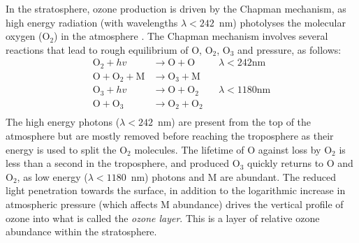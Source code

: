     In the stratosphere, ozone production is driven by the Chapman mechanism, as high energy radiation (with wavelengths $\lambda<242$~nm) photolyses the molecular oxygen (O$_2$) in the atmosphere \parencite[][Chapter 3, section 2]{BrasseurJacob2017}.
    The Chapman mechanism involves several reactions that lead to rough equilibrium of O, O$_2$, O$_3$ and pressure, as follows:
    \begin{equation}
      \begin{aligned}
        \text{O}_2 + hv              & \to \text{O}+\text{O}     && \lambda < 242 \text{nm} \\
        \text{O}+\text{O}_2+\text{M} & \to \text{O}_3+\text{M}   &&    \\
        \text{O}_3 + hv              & \to \text{O}+\text{O}_2   && \lambda < 1180 \text{nm} \\
        \text{O} + \text{O}_3        & \to \text{O}_2+\text{O}_2 &&       \\
      \end{aligned}
      \label{LR:O3:eqn_Chapman}
    \end{equation}
    The high energy photons ($\lambda < 242$~nm) are present from the top of the atmosphere but are mostly removed before reaching the troposphere as their energy is used to split the O$_2$ molecules.
    The lifetime of O against loss by O$_2$ is less than a second in the troposphere, and produced O$_3$ quickly returns to O and O$_2$, as low energy ($\lambda < 1180$~nm) photons and M are abundant.
    The reduced light penetration towards the surface, in addition to the logarithmic increase in atmospheric pressure (which affects M abundance) drives the vertical profile of ozone into what is called the \textit{ozone layer}.
    This is a layer of relative ozone abundance within the stratosphere.
  

